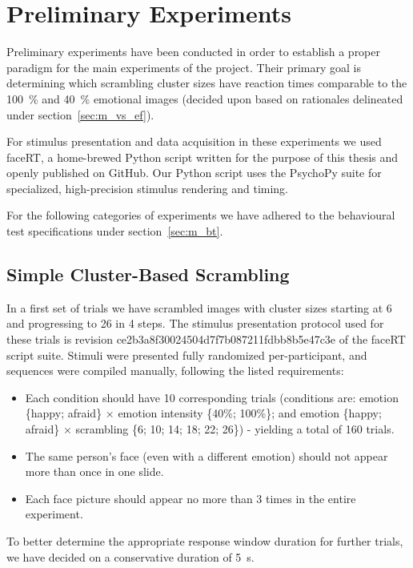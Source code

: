    \section{Preliminary Experiments}\label{sec:m_pe}
	Preliminary experiments have been conducted in order to establish a proper paradigm for the main experiments of the project. 
	Their primary goal is determining which scrambling cluster sizes have reaction times comparable to the \SI{100}{\percent} and \SI{40}{\percent} emotional images (decided upon based on rationales delineated under section~\ref{sec:m_vs_ef}).
	
	For stimulus presentation and data acquisition in these experiments we used faceRT\cite{faceRT}, a home-brewed Python script written for the purpose of this thesis and openly published on GitHub.
	Our Python script uses the PsychoPy suite\cite{Peirce2008} for specialized, high-precision stimulus rendering and timing.
	
	For the following categories of experiments we have adhered to the behavioural test specifications under section~\ref{sec:m_bt}.  
	\subsection{Simple Cluster-Based Scrambling}\label{sec:m_pe_ss}
	    In a first set of trials we have scrambled images with cluster sizes starting at \SI{6}{\pixel} and progressing to \SI{26}{\pixel} in \SI{4}{\pixel} steps.
	    The stimulus presentation protocol used for these trials is revision \textcolor{lg}{ce2b3a8f30024504d7f7b087211fdbb8b5e47c3e} of the faceRT\cite{faceRT} script suite.
	    Stimuli were presented fully randomized per-participant, and sequences were compiled manually, following the listed requirements:
	    \begin{itemize}
		\item Each condition should have 10 corresponding trials (conditions are: emotion \{happy; afraid\} $\times$ emotion intensity \{40\%; 100\%\}; and emotion \{happy; afraid\} $\times$ scrambling \{6; 10; 14; 18; 22; 26\}) - yielding a total of 160 trials.
		\item The same person's face (even with a different emotion) should not appear more than once in one slide.
		\item Each face picture should appear no more than 3 times in the entire experiment.
	    \end{itemize}
	    To better determine the appropriate response window duration for further trials, we have decided on a conservative duration of \SI{5}{\second}.
	    
